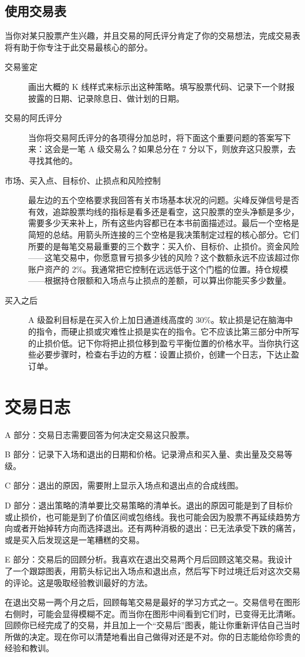 \subsection*{使用交易表}
当你对某只股票产生兴趣，并且交易的阿氏评分肯定了你的交易想法，完成交易表将有助于你专注于此交易最核心的部分。

\begin{description}
    \item[交易鉴定] 画出大概的 K 线样式来标示出这种策略。填写股票代码、记录下一个财报披露的日期、记录除息日、做计划的日期。
    \item[交易的阿氏评分] 当你将交易阿氏评分的各项得分加总时，将下面这个重要问题的答案写下来：这会是一笔 A 级交易么？如果总分在 7 分以下，则放弃这只股票，去寻找其他的。
    \item[市场、买入点、目标价、止损点和风险控制] 最左边的五个空格要求我回答有关市场基本状况的问题。尖峰反弹信号是否有效，追踪股票均线的指标是看多还是看空，这只股票的空头净额是多少，需要多少天来补上，所有这些内容都已在本书前面描述过。最后一个空格是简短的总结。用箭头所连接的三个空格是我决策制定过程的核心部分。它们所要的是每笔交易最重要的三个数字：买入价、目标价、止损价。资金风险——这笔交易中，你愿意冒亏损多少钱的风险？这个数额永远不应该超过你账户资产的 2\%。我通常把它控制在远远低于这个门槛的位置。持仓规模——根据持仓限额和入场点与止损点的差额，可以算出你能买多少数量。
    \item[买入之后] A 级盈利目标是在买入价上加日通道线高度的 30\%。软止损是记在脑海中的指令，而硬止损或灾难性止损是实在的指令。它不应该比第三部分中所写的止损价低。记下你将把止损位移到盈亏平衡位置的价格水平。当你执行这些必要步骤时，检查右手边的方框：设置止损价，创建一个日志，下达止盈订单。
\end{description}
\section{交易日志}
A 部分：交易日志需要回答为何决定交易这只股票。

B 部分：记录下入场和退出的日期和价格。记录滑点和买入量、卖出量及交易等级。

C 部分：退出的原因，需要附上显示入场点和退出点的合成线图。

D 部分：退出策略的清单要比交易策略的清单长。退出的原因可能是到了目标价或止损价，也可能是到了价值区间或包络线。我也可能会因为股票不再延续趋势方向或者开始掉转方向而选择退出。还有两种消极的退出：已无法承受下跌的痛苦，或是买入后发现这是一笔糟糕的交易。

E 部分：交易后的回顾分析。我喜欢在退出交易两个月后回顾这笔交易。我设计了一个跟踪图表，用箭头标记出入场点和退出点，然后写下时过境迁后对这次交易的评论。这是吸取经验教训最好的方法。

在退出交易一两个月之后，回顾每笔交易是最好的学习方式之一。交易信号在图形右侧时，可能会显得模糊不定。而当你在图形中间看到它们时，已变得无比清晰。回顾你已经完成了的交易，并且加上一个“交易后”图表，能让你重新评估自己当时所做的决定。现在你可以清楚地看出自己做得对还是不对。你的日志能给你珍贵的经验和教训。
